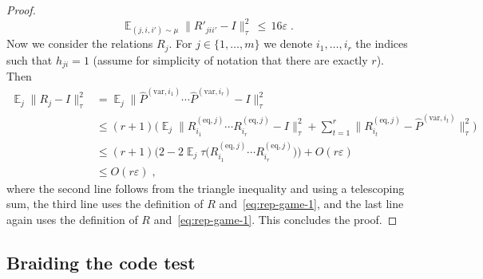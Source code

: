 \documentclass[11pt]{article}
\theoremstyle{definition}
\newcommand{\Id}{\ensuremath{I}}
\DeclareMathOperator*{\Expectation}{\mathbb{E}}
\newcommand{\Es}[1]{\Expectation_{#1}}
\newcommand{\eps}{\varepsilon}
\newcommand{\eq}{\mathrm{eq}}
\newcommand{\var}{\mathrm{var}}
\begin{document}
\begin{proof}
\[ \Es{(j,i,i')\sim\mu} \|R'_{jii'}-\Id\|_\tau^2 \,\leq\, 16\eps\;.\]
Now we consider the relations $R_j$. For $j\in\{1,\ldots,m\}$ we denote $i_1,\ldots,i_r$ the indices such that $h_{ji}=1$ (assume for simplicity of notation that there are exactly $r$). Then 
\begin{align*}
\Es{j} \|R_{j}-\Id\|_\tau^2
 &= \Es{j} \big\| \widehat{P}^{(\var,i_1)}\cdots \widehat{P}^{(\var,i_r)}-\Id\big\|_\tau^2\\
&\leq (r+1)\Big(\Es{j} \big\| R^{(\eq,j)}_{i_1}\cdots R^{(\eq,j)}_{i_r}-\Id\big\|_\tau^2 + \sum_{t=1}^r \big\|R^{(\eq,j)}_{i_t}-\widehat{P}^{(\var,i_t)}\big\|_\tau^2\Big)\\
&\leq (r+1)\big(2-2\Es{j}\tau\big( R^{(\eq,j)}_{i_1}\cdots R^{(\eq,j)}_{i_r}\big)\big) + O(r\eps)\\
&\leq O(r\eps)\;,
\end{align*}
where the second line follows from the triangle inequality and using a telescoping sum, the third line uses the definition of $R$ and~\eqref{eq:rep-game-1}, and the last line again uses the definition of $R$ and~\eqref{eq:rep-game-1}. This concludes the proof. 
\end{proof}





\subsection{Braiding the code test}
\end{document}
